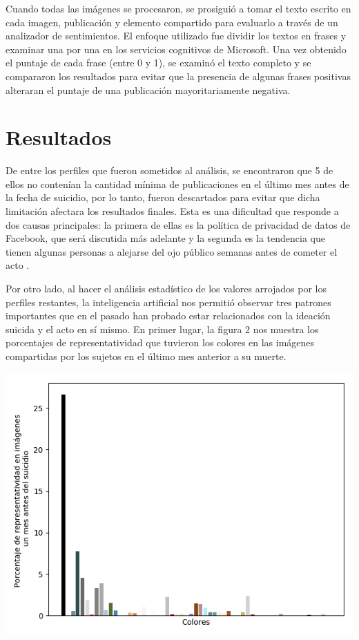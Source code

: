 \documentclass[12pt, donotrepeattitle, jou]{apa6}
\begin{document}
    Cuando todas las imágenes se procesaron, se prosiguió a tomar el texto escrito en cada imagen, publicación y elemento compartido para evaluarlo a través de un analizador de sentimientos. El enfoque utilizado fue dividir los textos en frases y examinar una por una en los servicios cognitivos de Microsoft. Una vez obtenido el puntaje de cada frase (entre 0 y 1), se examinó el texto completo y se compararon los resultados para evitar que la presencia de algunas frases positivas alteraran el puntaje de una publicación mayoritariamente negativa.

    \section{Resultados}
    De entre los perfiles que fueron sometidos al análisis, se encontraron que 5 de ellos no contenían la cantidad mínima de publicaciones en el último mes antes de la fecha de suicidio, por lo tanto, fueron descartados para evitar que dicha limitación afectara los resultados finales. Esta es una dificultad que responde a dos causas principales: la primera de ellas es la política de privacidad de datos de Facebook, que será discutida más adelante y la segunda es la tendencia que tienen algunas personas a alejarse del ojo público semanas antes de cometer el acto \parencite{SuicidalB}.
    
    
    Por otro lado, al hacer el análisis estadístico de los valores arrojados por los perfiles restantes, la inteligencia artificial nos permitió observar tres patrones importantes que en el pasado han probado estar relacionados con la ideación suicida y el acto en sí mismo. En primer lugar, la figura 2 nos muestra los porcentajes de representatividad que tuvieron los colores en las imágenes compartidas por los sujetos en el último mes anterior a su muerte.
    
    \begin{center}
        \begin{minipage}{0.8\linewidth}
            \includegraphics[width=\linewidth]{images/colors_global}
        \end{minipage}
    \end{center}
\end{document}
